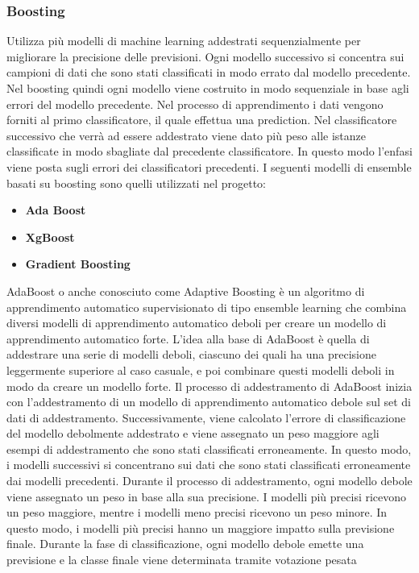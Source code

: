 \documentclass[italian,12pt,a4paper]{article}
\begin{document}
    \subsubsection{Boosting}
    Utilizza più modelli di machine learning addestrati sequenzialmente per migliorare la precisione delle previsioni. Ogni modello successivo si concentra sui campioni di dati che sono stati classificati in modo errato dal modello precedente. Nel boosting quindi ogni modello viene costruito in modo sequenziale in base agli errori del modello precedente. Nel processo di apprendimento i dati vengono forniti al primo classificatore, il quale effettua una prediction. Nel classificatore successivo che verrà ad essere addestrato viene dato più peso alle istanze classificate in modo sbagliate dal precedente classificatore. In questo modo l’enfasi viene posta sugli errori dei classificatori precedenti. I seguenti modelli di ensemble basati su boosting sono quelli utilizzati nel progetto:
    \\
    \vspace{25pt}

     \begin{itemize}
		\item \textbf{Ada Boost}
		\item \textbf{XgBoost}
        \item  \textbf{Gradient Boosting}
    \end{itemize}

     \vspace{25pt}

     AdaBoost o anche conosciuto come Adaptive Boosting è un algoritmo di apprendimento automatico supervisionato di tipo ensemble learning che combina diversi modelli di apprendimento automatico deboli per creare un modello di apprendimento automatico forte. L'idea alla base di AdaBoost è quella di addestrare una serie di modelli deboli, ciascuno dei quali ha una precisione leggermente superiore al caso casuale, e poi combinare questi modelli deboli in modo da creare un modello forte. Il processo di addestramento di AdaBoost inizia con l'addestramento di un modello di apprendimento automatico debole sul set di dati di addestramento. Successivamente, viene calcolato l'errore di classificazione del modello debolmente addestrato e viene assegnato un peso maggiore agli esempi di addestramento che sono stati classificati erroneamente. In questo modo, i modelli successivi si concentrano sui dati che sono stati classificati erroneamente dai modelli precedenti. Durante il processo di addestramento, ogni modello debole viene assegnato un peso in base alla sua precisione. I modelli più precisi ricevono un peso maggiore, mentre i modelli meno precisi ricevono un peso minore. In questo modo, i modelli più precisi hanno un maggiore impatto sulla previsione finale. Durante la fase di classificazione, ogni modello debole emette una previsione e la classe finale viene determinata tramite votazione pesata
    \\
    \vspace{25pt}
\end{document}
